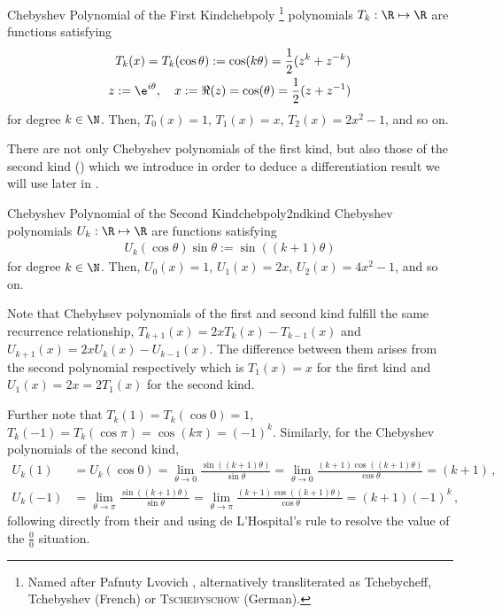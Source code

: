 \documentclass{prettytex/ox/mmsc-special-topic}
\begin{document}
  \begin{definition}{Chebyshev Polynomial of the First Kind}{chebpoly}
    \chebyshev\footnote{Named after Pafnuty Lvovich \textsc{\chebyshev}, alternatively transliterated as Tchebycheff, Tchebyshev (French) or \textsc{Tschebyschow} (German).} polynomials $T_k: \R \mapsto \R$ are functions satisfying
    \begin{align*}
      T_k(x) = T_k(\cos \theta) := \cos(k \theta) = \frac{1}{2} (z^k + z^{-k}) \\
      z := \e^{i \theta},\quad x := \Re(z) = \cos(\theta) = \frac{1}{2}(z + z^{-1})
    \end{align*}
    for degree $k \in \N$. Then, $T_0(x) = 1$, $T_1(x) = x$, $T_2(x) = 2x^2-1$, and so on.
  \end{definition}

  There are not only Chebyshev polynomials of the first kind, but also those of the second kind () which we introduce in order to deduce a differentiation result we will use later in .

  \begin{definition}{Chebyshev Polynomial of the Second Kind}{chebpoly2ndkind}
    Chebyshev polynomials $U_k: \R \mapsto \R$ are functions satisfying
    \begin{align*}
      U_k(\cos \theta) \sin \theta := \sin\left((k+1) \theta\right)
    \end{align*}
    for degree $k \in \N$. Then, $U_0(x) = 1$, $U_1(x) = 2x$, $U_2(x) = 4x^2-1$, and so on.
  \end{definition}
  Note that Chebyhsev polynomials of the first and second kind fulfill the same recurrence relationship, $T_{k+1}(x) = 2x T_k(x) - T_{k-1}(x)$ and $U_{k+1}(x) = 2x U_k(x) - U_{k-1}(x)$. The difference between them arises from the second polynomial respectively which is $T_1(x)=x$ for the first kind and $U_1(x) = 2x = 2 T_1(x)$ for the second kind.

  Further note that $T_k(1) = T_k(\cos 0) = 1$, $T_k(-1) = T_k(\cos \pi) = \cos(k \pi) = (-1)^k$.
  Similarly, for the Chebyshev polynomials of the second kind,
  \begin{align}
    \label{eq:cheb2ndkind-critical-value-1} U_k(1)   & = U_k(\cos 0) = \lim_{\theta \rightarrow 0} \frac{\sin\left((k+1) \theta\right)}{\sin \theta} = \lim_{\theta \rightarrow 0} \frac{(k+1)\cos\left((k+1) \theta\right)}{\cos \theta} = (k+1)\,, \\
    \label{eq:cheb2ndkind-critical-value--1} U_k(-1) & = \lim_{\theta \rightarrow \pi} \frac{\sin\left((k+1) \theta\right)}{\sin \theta} = \lim_{\theta \rightarrow \pi} \frac{(k+1)\cos\left((k+1) \theta\right)}{\cos \theta} = (k+1) (-1)^k\,,
  \end{align}
  following directly from their  and using de L'Hospital's rule to resolve the value of the $\frac{0}{0}$ situation.
\end{document}
